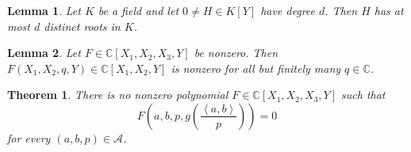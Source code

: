 \documentclass[10pt,a4paper]{amsart}
\newtheorem{theorem}{Theorem}
\newtheorem{lemma}{Lemma}
\newcommand{\CC}{\mathbb{C}}
\newcommand{\cA}{\mathcal{A}}
\newcommand{\gen}[1]{\left\langle #1\right\rangle}
\begin{document}
\begin{lemma}\label{lem:root-bound}
Let $K$ be a field and let $0\neq H\in K[Y]$ have degree $d$.  Then $H$ has at most $d$ distinct roots in $K$.
\end{lemma}

\begin{lemma}\label{lem:specialization}
Let $F\in\CC[X_1,X_2,X_3,Y]$ be nonzero.  Then $F(X_1,X_2,q,Y)\in\CC[X_1,X_2,Y]$ is nonzero for all but finitely many $q\in\CC$.
\end{lemma}

\begin{theorem}\label{thm:main}
There is no nonzero polynomial $F\in\CC[X_1,X_2,X_3,Y]$ such that
\begin{equation}\label{eq:main-relation}
  F\left(a,b,p,
  g\!\left(\frac{\gen{a,b}}{p}\right)\right)=0
\end{equation}
for every $(a,b,p)\in\cA$.
\end{theorem}
\end{document}
